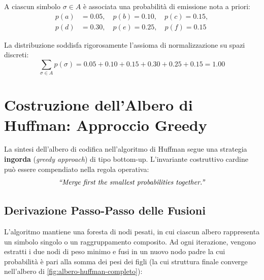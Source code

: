 A ciascun simbolo $\sigma \in A$ \`e associata una probabilit\`a di emissione nota a priori:
\begin{align}
  p(a) &= 0.05, \quad p(b) = 0.10, \quad p(c) = 0.15, \nonumber \\
  p(d) &= 0.30, \quad p(e) = 0.25, \quad p(f) = 0.15
\end{align}

La distribuzione soddisfa rigorosamente l'assioma di normalizzazione su spazi discreti:
\begin{equation}
  \sum_{\sigma \in A} p(\sigma) = 0.05 + 0.10 + 0.15 + 0.30 + 0.25 + 0.15 = 1.00
\end{equation}

\FloatBarrier
\section{Costruzione dell'Albero di Huffman: Approccio Greedy}
\label{sec:costruzione-albero-huffman}

La sintesi dell'albero di codifica nell'algoritmo di Huffman segue una strategia \textbf{ingorda} (\textit{greedy approach}) di tipo bottom-up. L'invariante costruttivo cardine pu\`o essere compendiato nella regola operativa:
\begin{equation}
  \text{\textit{``Merge first the smallest probabilities together.''}}
\end{equation}

\FloatBarrier
\subsection{Derivazione Passo-Passo delle Fusioni}
\label{subsec:passi-fusione-huffman}

L'algoritmo mantiene una foresta di nodi pesati, in cui ciascun albero rappresenta un simbolo singolo o un raggruppamento composito. Ad ogni iterazione, vengono estratti i due nodi di peso minimo e fusi in un nuovo nodo padre la cui probabilit\`a \`e pari alla somma dei pesi dei figli (la cui struttura finale converge nell'albero di \autoref{fig:albero-huffman-completo}):


